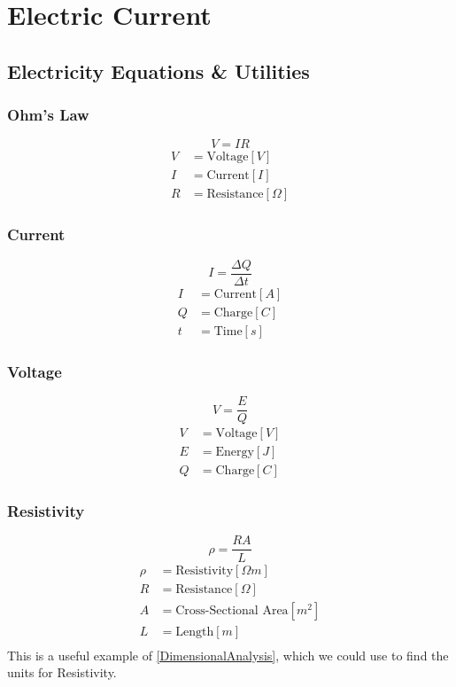 \chapter{Electric Current}
\section{Electricity Equations \& Utilities}
\subsection{Ohm's Law}
\[ V = IR \] \label{Eq_OhmsLaw}
\begin{align*}
	V &= \text{Voltage} \left[ V \right] \\
	I &= \text{Current} \left[ I \right] \\
	R &= \text{Resistance} \left[ \Omega \right] 
\end{align*}

\subsection{Current}
\[ I = \frac{\Delta Q}{\Delta t} \] \label{Eq_Current}
\begin{align*}
	I &= \text{Current} \left[ A \right] \\
	Q &= \text{Charge} \left[ C \right] \\
	t &= \text{Time} \left[ s \right] 
\end{align*}

\subsection{Voltage}
\[ V = \frac{E}{Q} \] \label{Eq_Voltage}
\begin{align*}
	V &= \text{Voltage} \left[ V \right] \\
	E &= \text{Energy} \left[ J \right]  \\
	Q &= \text{Charge} \left[ C \right]
\end{align*}

\subsection{Resistivity}
\[\rho = \frac{RA}{L}\]
\begin{align*}
	\rho &= \text{Resistivity} \left[ \Omega m \right] \\
	R &= \text{Resistance} \left[ \Omega \right] \\
	A &= \text{Cross-Sectional Area} \left[ m^2 \right] \\
	L &= \text{Length} \left[ m \right] \\
\end{align*}
This is a useful example of \eqref{DimensionalAnalysis}, which we could use to find the units for Resistivity.

